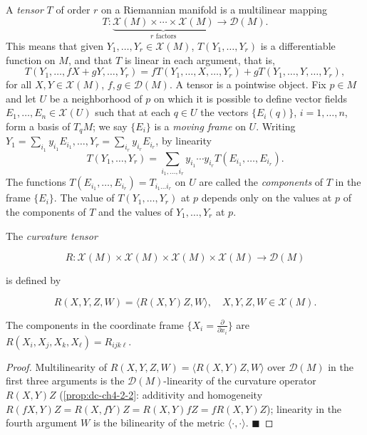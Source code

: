 \begin{definition}
  \label{def:dc-ch4-5-1}


  A \emph{tensor} $T$ of order $r$ on a Riemannian manifold is a multilinear mapping
  $$
  T:\underbrace{\mathcal{X}(M)\times\cdots\times\mathcal{X}(M)}_{r\text{ factors}}\to\mathcal{D}(M).
  $$
  This means that given $Y_1,\dots,Y_r\in\mathcal{X}(M)$, $T(Y_1,\dots,Y_r)$ is a
  differentiable function on $M$, and that $T$ is linear in each argument, that is,
  $$
  T(Y_1,\dots,fX+gY,\dots,Y_r)=fT(Y_1,\dots,X,\dots,Y_r)+gT(Y_1,\dots,Y,\dots,Y_r),
  $$
  for all $X,Y\in\mathcal{X}(M)$, $f,g\in\mathcal{D}(M)$.
  A tensor is a pointwise object. Fix $p\in M$ and let $U$ be a neighborhood of $p$
  on which it is possible to define vector fields $E_1,\dots,E_n\in\mathcal{X}(U)$
  such that at each $q\in U$ the vectors $\{E_i(q)\}$, $i=1,\dots,n$, form a basis of
  $T_qM$; we say $\{E_i\}$ is a \emph{moving frame} on $U$. Writing
  $Y_1=\sum_{i_1}y_{i_1}E_{i_1},\dots,Y_r=\sum_{i_r}y_{i_r}E_{i_r}$, by linearity
  $$
  T(Y_1,\dots,Y_r)=\sum_{i_1,\dots,i_r}y_{i_1}\cdots y_{i_r}T(E_{i_1},\dots,E_{i_r}).
  $$
  The functions $T(E_{i_1},\dots,E_{i_r})=T_{i_1\dots i_r}$ on $U$ are called the
  \emph{components} of $T$ in the frame $\{E_i\}$. The value of $T(Y_1,\dots,Y_r)$ at $p$
  depends only on the values at $p$ of the components of $T$ and the values of
  $Y_1,\dots,Y_r$ at $p$.
\end{definition}

\begin{example}
  \label{ex:dc-ch4-5-2}


  The \emph{curvature tensor}

  $$
  R:\mathcal{X}(M)\times\mathcal{X}(M)\times\mathcal{X}(M)\times\mathcal{X}(M)\to\mathcal{D}(M)
  $$

  is defined by

  $$
  R(X,Y,Z,W)=\langle R(X,Y)Z,W\rangle,\quad X,Y,Z,W\in\mathcal{X}(M).
  $$

  The components in the coordinate frame $\{X_i=\frac{\partial}{\partial x_i}\}$
  are $R(X_i,X_j,X_k,X_\ell)=R_{ijk\ell}$.
\end{example}
\begin{proof}

  \sketch
  Multilinearity of $R(X,Y,Z,W)=\langle R(X,Y)Z,W\rangle$ over $\mathcal{D}(M)$
  in the first three arguments is the $\mathcal{D}(M)$-linearity of the curvature
  operator $R(X,Y)Z$ (\cref{prop:dc-ch4-2-2}: additivity and homogeneity
  $R(fX,Y)Z=R(X,fY)Z=R(X,Y)fZ=fR(X,Y)Z$); linearity in the fourth argument $W$
  is the bilinearity of the metric $\langle\cdot,\cdot\rangle$. $\blacksquare$
\end{proof}

